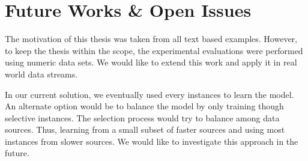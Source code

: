 \section{Future Works \& Open Issues}
The motivation of this thesis was taken from all text based examples. However, to keep the thesis within the scope, the experimental evaluations were performed using numeric data sets. We would like to extend this work and apply it  in real world data streams. 

In our current solution, we eventually used every instances to learn the model. An alternate option would be to balance the model by only training though selective instances. The selection process would try to balance among data sources. Thus, learning from a small subset of faster sources and using most instances from slower sources. We would like to investigate this approach in the future.





